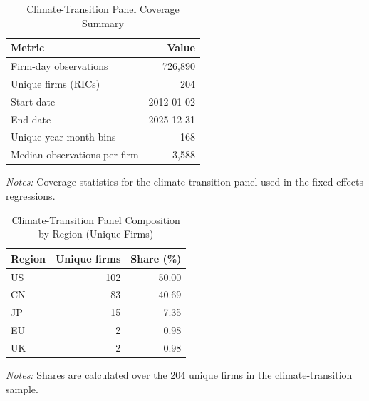 \documentclass{article}
\theoremstyle{plain}
\begin{document}
\begin{table}[htbp]
\centering
\caption{Climate-Transition Panel Coverage Summary}
\label{tab:energy_desc_coverage}
\begin{threeparttable}
\small
\begin{tabular}{l r}
\toprule
Metric & Value \\
\midrule
Firm-day observations & 726,890 \\
Unique firms (RICs) & 204 \\
Start date & 2012-01-02 \\
End date & 2025-12-31 \\
Unique year-month bins & 168 \\
Median observations per firm & 3,588 \\
\bottomrule
\end{tabular}
\begin{tablenotes}\small
\item \textit{Notes:} Coverage statistics for the climate-transition panel used in the fixed-effects regressions.
\end{tablenotes}
\end{threeparttable}
\end{table}

\begin{table}[htbp]
\centering
\caption{Climate-Transition Panel Composition by Region (Unique Firms)}
\label{tab:energy_desc_region}
\begin{threeparttable}
\small
\begin{tabular}{l r r}
\toprule
Region & Unique firms & Share (\%) \\
\midrule
US & 102 & 50.00 \\
CN & 83 & 40.69 \\
JP & 15 & 7.35 \\
EU & 2 & 0.98 \\
UK & 2 & 0.98 \\
\bottomrule
\end{tabular}
\begin{tablenotes}\small
\item \textit{Notes:} Shares are calculated over the 204 unique firms in the climate-transition sample.
\end{tablenotes}
\end{threeparttable}
\end{table}
\end{document}
